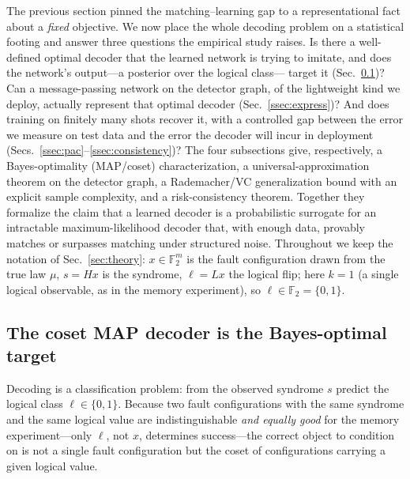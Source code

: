 \documentclass[aps,prxquantum,twocolumn,superscriptaddress,nofootinbib,longbibliography]{revtex4-2}
\newcommand{\F}{\mathbb{F}}
\begin{document}
The previous section pinned the matching--learning gap to a representational
fact about a \emph{fixed} objective. We now place the whole decoding problem on
a statistical footing and answer three questions the empirical study raises. Is
there a well-defined optimal decoder that the learned network is trying to
imitate, and does the network's output---a posterior over the logical class---
target it (Sec.~\ref{ssec:bayes-opt})? Can a message-passing network on the
detector graph, of the lightweight kind we deploy, actually represent that
optimal decoder (Sec.~\ref{ssec:express})? And does training on finitely many
shots recover it, with a controlled gap between the error we measure on test
data and the error the decoder will incur in deployment
(Secs.~\ref{ssec:pac}--\ref{ssec:consistency})? The four subsections give,
respectively, a Bayes-optimality (MAP/coset) characterization, a
universal-approximation theorem on the detector graph, a
Rademacher/VC generalization bound with an explicit sample complexity, and a
risk-consistency theorem. Together they formalize the claim that a learned
decoder is a probabilistic surrogate for an intractable maximum-likelihood
decoder that, with enough data, provably matches or surpasses matching under
structured noise. Throughout we keep the notation of Sec.~\ref{sec:theory}:
$x\in\F_2^m$ is the fault configuration drawn from the true law $\mu$, $s=Hx$ is
the syndrome, $\ell=Lx$ the logical flip; here $k=1$ (a single logical
observable, as in the memory experiment), so $\ell\in\F_2=\{0,1\}$.

\subsection{The coset MAP decoder is the Bayes-optimal target}
\label{ssec:bayes-opt}

Decoding is a classification problem: from the observed syndrome $s$ predict the
logical class $\ell\in\{0,1\}$. Because two fault configurations with the same
syndrome and the same logical value are indistinguishable \emph{and equally good}
for the memory experiment---only $\ell$, not $x$, determines success---the correct
object to condition on is not a single fault configuration but the coset of
configurations carrying a given logical value.
\end{document}
